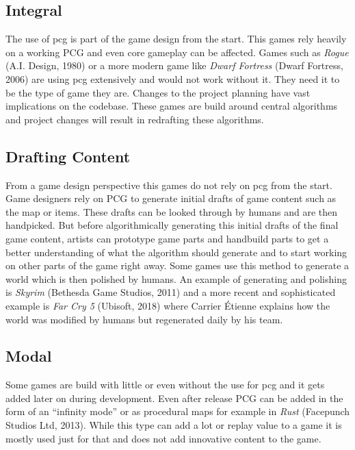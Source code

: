 \documentclass[10pt,a4paper]{article}
\begin{document}
\subsection{Integral}
\begin{multicols}{2} The use of \gls{pcg} is part of the game design from the start. This games rely heavily on a working PCG and even core gameplay can be affected. Games such as \textit{Rogue} (A.I. Design, 1980) or a more modern game like \textit{Dwarf Fortress} (Dwarf Fortress, 2006) are using \gls{pcg} extensively and would not work without it. They need it to be the type of game they are. Changes to the project planning have vast implications on the codebase. These games are build around central algorithms and project changes will result in redrafting these algorithms.
\end{multicols}
\subsection{Drafting Content}
\begin{multicols}{2} From a game design perspective this games do not rely on \gls{pcg} from the start. Game designers rely on PCG to generate initial drafts of game content such as the map or items. These drafts can be looked through by humans and are then handpicked. But before algorithmically generating this initial drafts of the final game content, artists can prototype game parts and handbuild parts to get a better understanding of what the algorithm should generate and to start working on other parts of the game right away. Some games use this method to generate a world which is then polished by humans. An example of generating and polishing is \textit{Skyrim} (Bethesda Game Studios, 2011) and a more recent and sophisticated example is \textit{Far Cry 5} (Ubisoft, 2018) where Carrier Étienne explains how the world was modified by humans but regenerated daily by his team\cite{Carrier2018}.
\end{multicols}
\subsection{Modal}
\begin{multicols}{2} Some games are build with little or even without the use for \gls{pcg} and it gets added later on during development. Even after release PCG can be added in the form of an “infinity mode” or as procedural maps for example in \textit{Rust} (Facepunch Studios Ltd, 2013). While this type can add a lot or replay value to a game it is mostly used just for that and does not add innovative content to the game.
\end{multicols}
\end{document}
